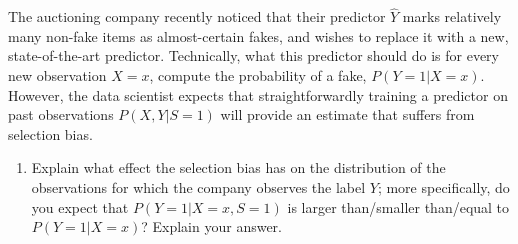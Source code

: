The auctioning company recently noticed that their predictor $\hat{Y}$ marks relatively many non-fake items as almost-certain fakes, and wishes to replace it with a new, state-of-the-art predictor. Technically, what this predictor should do is for every new observation $X=x$, compute the probability of a fake, $P(Y=1|X=x)$. However, the data scientist expects that straightforwardly training a predictor on past observations $P(X, Y|S=1)$ will provide an estimate that suffers from selection bias.
\begin{enumerate}[resume*]
  \item Explain what effect the selection bias has on the distribution of the observations for which the company observes the label $Y$; more specifically, do you expect that $P(Y=1|X=x,S=1)$ is larger than/smaller than/equal to $P(Y=1|X=x)$? 
    Explain your answer.
\end{enumerate}

